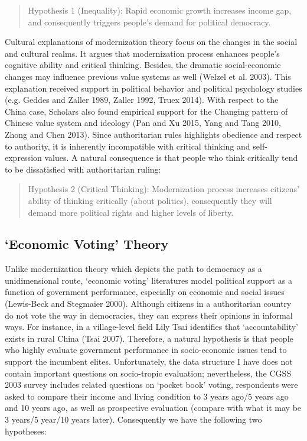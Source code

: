 \documentclass[12pt]{article}\usepackage[]{graphicx}\usepackage[]{color}
\begin{document}
\begin{quotation}
	Hypothesis 1 (Inequality): Rapid economic growth increases income gap, and consequently triggers people's demand for political democracy.
\end{quotation}

Cultural explanations of modernization theory focus on the changes in the social and cultural realms. It argues that modernization process enhances people's cognitive ability and critical thinking. Besides, the dramatic social-economic changes may influence previous value systems as well (Welzel et al. 2003). This explanation received support in political behavior and political psychology studies (e.g. Geddes and Zaller 1989, Zaller 1992, Truex 2014). With respect to the China case, Scholars also found empirical support for the Changing pattern of Chinese value system and ideology (Pan and Xu 2015, Yang and Tang 2010, Zhong and Chen 2013). Since authoritarian rules highlights obedience and respect to authority, it is inherently incompatible with critical thinking and self-expression values. A natural consequence is that people who think critically tend to be dissatisfied with authoritarian ruling:

\begin{quotation}
	Hypothesis 2 (Critical Thinking): Modernization process increases citizens' ability of thinking critically (about politics), consequently they will demand more political rights and higher levels of liberty.
\end{quotation}
\nocite{Kuznets1955,Welzeletal2003}
\nocite{Acemoglu2005,Boix2003}


\subsection{`Economic Voting' Theory}
Unlike modernization theory which depicts the path to democracy as a unidimensional route, `economic voting' literatures model political support as a function of government performance, especially on economic and social issues (Lewis-Beck and Stegmaier 2000). Although citizens in a authoritarian country do not vote the way in democracies, they can express their opinions in informal ways. For instance, in a village-level field Lily Tsai identifies that `accountability' exists in rural China (Tsai 2007). Therefore, a natural hypothesis is that people who highly evaluate government performance in socio-economic issues tend to support the incumbent elites. Unfortunately, the data structure I have does not contain important questions on socio-tropic evaluation; nevertheless, the CGSS 2003 survey includes related questions on `pocket book' voting, respondents were asked to compare their income and living condition to 3 years ago/5 years ago and 10 years ago, as well as prospective evaluation (compare with what it may be 3 years/5 year/10 years later). Consequently we have the following two hypotheses:
\end{document}
